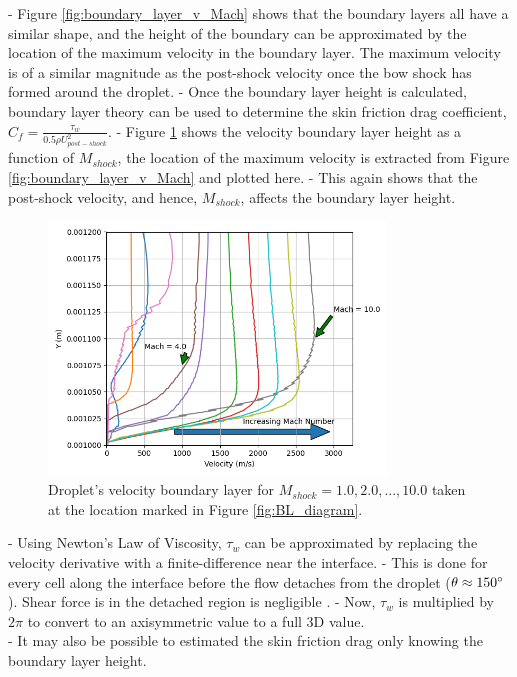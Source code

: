 \documentclass{UCF_ETD}
\begin{document}
- Figure \ref{fig:boundary_layer_v_Mach} shows that the boundary layers all have a similar shape, and the height of the boundary can be approximated by the location of the maximum velocity in the boundary layer. The maximum velocity is of a similar magnitude as the post-shock velocity once the bow shock has formed around the droplet.
- Once the boundary layer height is calculated, boundary layer theory can be used to determine the skin friction drag coefficient, $C_{f} = \frac{\tau_{w}}{0.5 \rho U^{2}_{post-shock}}$.
- Figure \ref{fig:BL_heigh_v_mach} shows the velocity boundary layer height as a function of $M_{shock}$, the location of the maximum velocity is extracted from Figure \ref{fig:boundary_layer_v_Mach} and plotted here.
- This again shows that the post-shock velocity, and hence, $M_{shock}$, affects the boundary layer height.

\begin{figure}
    \centering
    \includegraphics[width=0.8\textwidth]{Figures/coplotted_BLs.png}
    \caption{Droplet's velocity boundary layer for $M_{shock} = 1.0, 2.0,...,10.0$ taken at the location marked in Figure \ref{fig:BL_diagram}.}
    \label{fig:BL_heigh_v_mach}
\end{figure}

- Using Newton's Law of Viscosity, $\tau_{w}$ can be approximated by replacing the velocity derivative with a finite-difference near the interface.
- This is done for every cell along the interface before the flow detaches from the droplet ($\theta \approx 150\degree$). Shear force is in the detached region is negligible \cite{Khan2004}. 
- Now, $\tau_{w}$ is multiplied by $2\pi$ to convert to an axisymmetric value to a full 3D value. \\
- It may also be possible to estimated the skin friction drag only knowing the boundary layer height.
\end{document}
